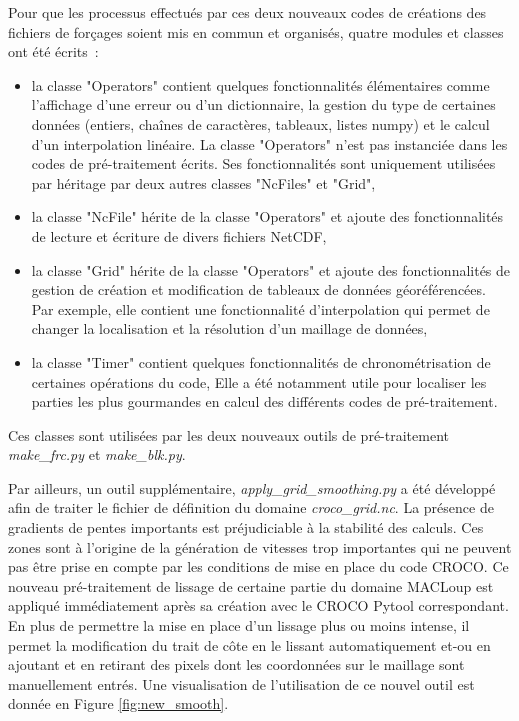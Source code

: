 \documentclass[10pt,a4paper,titlepage]{article}
\begin{document}
    Pour que les processus effectués par ces deux nouveaux codes de créations des fichiers de forçages soient mis en commun et organisés, quatre modules et classes ont été écrits~:
    \begin{itemize}
        \item la classe "Operators" contient quelques fonctionnalités élémentaires comme l'affichage d'une erreur ou d'un dictionnaire, la gestion du type de certaines données (entiers, chaînes de caractères, tableaux, listes numpy) et le calcul d'un interpolation linéaire.
        La classe "Operators" n'est pas instanciée dans les codes de pré-traitement écrits.
        Ses fonctionnalités sont uniquement  utilisées par héritage par deux autres classes "NcFiles" et "Grid",
        \item la classe "NcFile" hérite de la classe "Operators" et ajoute des fonctionnalités de lecture et écriture de divers fichiers NetCDF,
        \item la classe "Grid" hérite de la classe "Operators" et ajoute des fonctionnalités de gestion de création et modification de tableaux de données géoréférencées.
        Par exemple, elle contient une fonctionnalité d'interpolation qui permet de changer la localisation et la résolution d'un maillage de données,
        \item la classe "Timer" contient quelques fonctionnalités de chronométrisation de certaines opérations du code,
        Elle a été notamment utile pour localiser les parties les plus gourmandes en calcul des différents codes de pré-traitement.
    \end{itemize}
    Ces classes sont utilisées par les deux nouveaux outils de pré-traitement \textit{make\_frc.py} et \textit{make\_blk.py}.
    
    Par ailleurs, un outil supplémentaire, \textit{apply\_grid\_smoothing.py} a été développé afin de traiter le fichier de définition du domaine \textit{croco\_grid.nc}.
    La présence de gradients de pentes importants est préjudiciable à la stabilité des calculs. Ces zones sont à l'origine de la génération de vitesses trop importantes qui ne peuvent pas être prise en compte par les conditions de mise en place du code CROCO.
    Ce nouveau pré-traitement de lissage de certaine partie du domaine MACLoup est appliqué immédiatement après sa création avec le CROCO Pytool correspondant.
    En plus de permettre la mise en place d'un lissage plus ou moins intense, il permet la modification du trait de côte en le lissant automatiquement et-ou en ajoutant et en retirant des pixels dont les coordonnées sur le maillage sont manuellement entrés.
    Une visualisation de l'utilisation de ce nouvel outil est donnée en Figure \ref{fig:new_smooth}.
    
\end{document}
